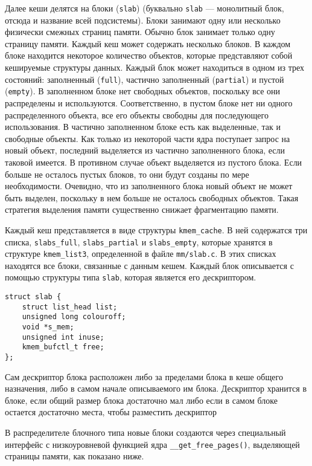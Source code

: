 \documentclass[12pt]{article}
\begin{document}
Далее кеши делятся на блоки (\verb!slab!) (буквально \verb!slab! — монолитный блок, отсюда и название всей подсистемы). Блоки занимают одну или несколько физически смежных
страниц памяти. Обычно блок занимает только одну страницу памяти. Каждый кеш может содержать несколько блоков.
В каждом блоке находится некоторое количество объектов, которые представляют собой
кешируемые структуры данных. Каждый блок может находиться в одном из трех состояний: заполненный (\verb!full!), частично заполненный (\verb!partial!) и пустой (\verb!empty!). В заполненном
блоке нет свободных объектов, поскольку все они распределены и используются. Соответственно, в пустом блоке нет ни одного распределенного объекта, все его объекты свободны
для последующего использования. В частично заполненном блоке есть как выделенные, так
и свободные объекты. Как только из некоторой части ядра поступает запрос на новый объект, последний выделяется из частично заполненного блока, если таковой имеется.
В противном случае объект выделяется из пустого блока. Если больше не осталось пустых блоков, то они будут созданы по мере необходимости. Очевидно, что из заполненного блока
новый объект не может быть выделен, поскольку в нем больше не осталось свободных объектов. Такая стратегия выделения памяти существенно снижает фрагментацию памяти.

Каждый кеш представляется в виде структуры \verb!kmem_cache!. В ней содержатся три
списка, \verb!slabs_full!, \verb!slabs_partial! и \verb!slabs_empty!,
которые хранятся в структуре \verb!kmem_list3!, определенной в файле \verb!mm/slab.c!.
В этих списках находятся все блоки, связанные с данным кешем. Каждый блок описывается с помощью структуры типа
\verb!slab!, которая является его дескриптором.

\begin{lstlisting}
struct slab {
    struct list_head list;
    unsigned long colouroff;
    void *s_mem;
    unsigned int inuse;
    kmem_bufctl_t free;
};
\end{lstlisting}

Сам дескриптор блока расположен либо за пределами блока в кеше общего назначения, либо в самом начале описываемого им блока. Дескриптор хранится в блоке, если
общий размер блока достаточно мал либо если в самом блоке остается достаточно места,
чтобы разместить дескриптор

В распределителе блочного типа новые блоки создаются через специальный интерфейс с низкоуровневой функцией ядра \verb!__get_free_pages()!, выделяющей страницы
памяти, как показано ниже.
\end{document}
